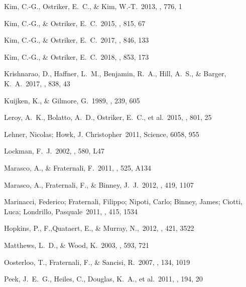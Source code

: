 \documentclass[twocolumn]{aastex62}
\begin{document}
\begin{thebibliography}{999}

 Kim, C.-G., Ostriker, E.~C., \& Kim, W.-T.\ 2013, \apj, 776, 1 

 Kim, C.-G., \& Ostriker, E.~C.\ 2015, \apj, 815, 67 

 Kim, C.-G., \& Ostriker, E.~C.\ 2017, \apj, 846, 133 

 Kim, C.-G., \& Ostriker, E.~C.\ 2018, \apj, 853, 173 

 Krishnarao, D., Haffner, L.~M., Benjamin, R.~A., Hill, A.~S., \& Barger, K.~A.\ 2017, \apj, 838, 43 

 Kuijken, K., \& Gilmore, G.\ 1989, \mnras, 239, 605 

 Leroy, A.~K., Bolatto, A.~D., Ostriker, E.~C., et al.\ 2015, \apj, 801, 25 

 Lehner, Nicolas; Howk, J. Christopher\ 2011, Science, 6058, 955

 Lockman, F.~J.\ 2002, \apjl, 580, L47 

 Marasco, A., \& Fraternali, F.\ 2011, \aap, 525, A134 

 Marasco, A., Fraternali, F., \& Binney, J.~J.\ 2012, \mnras, 419, 1107 

Marinacci, Federico; Fraternali, Filippo; Nipoti, Carlo; Binney, James; Ciotti, Luca; Londrillo, Pasquale\ 2011, \mnras, 415, 1534 

 Hopkins, P., F.,Quataert, E., \& Murray, N.,\ 2012, \mnras, 421, 3522

 Matthews, L.~D., \& Wood, K.\ 2003, \apj, 593, 721 

 Oosterloo, T., Fraternali, F., \& Sancisi, R.\ 2007, \aj, 134, 1019 

 Peek, J.~E.~G., Heiles, C., Douglas, K.~A., et al.\ 2011, \apjs, 194, 20 


\end{thebibliography}
\end{document}
